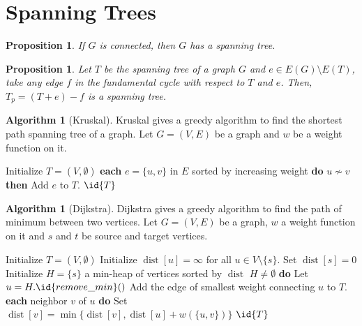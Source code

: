 \documentclass[paper=a4, fontsize=12pt]{scrartcl} %
\newtheorem{prop}[thm]{Proposition}
\theoremstyle{definition}
\newtheorem{alg}[thm]{Algorithm}
\theoremstyle{remark}
\DeclareMathOperator{\dist}{dist}
\numberwithin{equation}{section} %
\numberwithin{figure}{section} %
\numberwithin{table}{section} %
\begin{document}
\section{Spanning Trees}
\begin{prop}
	If $G$ is connected, then $G$ has a spanning tree.
\end{prop}
\begin{prop}
	Let $T$ be the spanning tree of a graph $G$ and $e \in E(G) \setminus E(T)$, take any edge $f$ in the fundamental cycle with respect to $T$ and $e$. Then, $T_p = (T+e)-f$ is a spanning tree.
\end{prop}
\begin{alg}[Kruskal]
	Kruskal gives a greedy algorithm to find the shortest path spanning tree of a graph. Let $G = (V,E)$ be a graph and $w$ be a weight function on it.
	\begin{codebox}
		\li Initialize $T = (V, \emptyset)$
		\li \For \textbf{each} $e = \{u,v\}$ in $E$ sorted by increasing weight \textbf{do} \Do
		\li \If $u \not\sim v$ \textbf{then}\Then
		\li Add $e$ to $T$.
		\End\End
		\li \Return $\id{T}$
	\end{codebox}
\end{alg}
\begin{alg}[Dijkstra]
	Dijkstra gives a greedy algorithm to find the path of minimum between two vertices. Let $G= (V,E)$ be a graph, $w$ a weight function on it and $s$ and $t$ be source and target vertices.
	\begin{codebox}
		\Procname{$\proc{Dijkstra}(G = (\id{V}, \id{E}), w, s, t)$}
		\li Initialize $T = (V, \emptyset)$
		\li Initialize $\dist[u] = \infty$ for all $u \in V \setminus \{s\}$. Set $\dist[s] = 0$
		\li Initialize $H = \{s\}$ a min-heap of vertices sorted by $\dist$
		\li \While $H \neq \emptyset$ \textbf{do} \Do
		\li Let $u = H.\id{remove\_min}()$
		\li Add the edge of smallest weight connecting $u$ to $T$.
		\li \For \textbf{each} neighbor $v$ of $u$ \textbf{do} \Do
		\li Set $\dist[v] = \min\{\dist[v] , \dist[u] + w(\{u,v\})\}$
		\End\End
		\li \Return $\id{T}$
	\end{codebox}
\end{alg}
\end{document}
